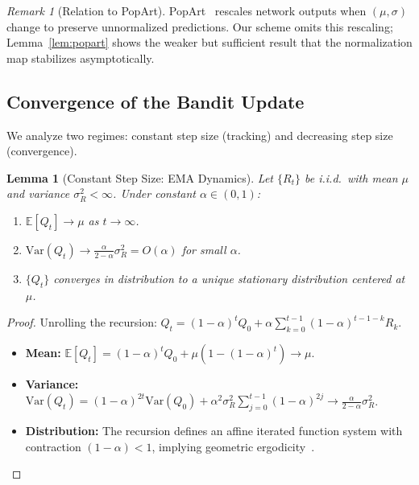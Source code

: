 \documentclass{article} %
\newtheorem{lemma}[theorem]{Lemma}
\theoremstyle{definition}
\theoremstyle{remark}
\newtheorem{remark}[theorem]{Remark}
\begin{document}
  \begin{remark}[Relation to PopArt]
  PopArt~\citep{hessel2019multi} rescales network outputs when $(\mu, \sigma)$ change to preserve unnormalized predictions. Our scheme omits this rescaling; Lemma~\ref{lem:popart} shows the weaker but sufficient result that the normalization map stabilizes asymptotically.
  \end{remark}

  \subsection{Convergence of the Bandit Update}

  We analyze two regimes: constant step size (tracking) and decreasing step size (convergence).

  \begin{lemma}[Constant Step Size: EMA Dynamics]
  \label{lem:ema}
  Let $\{R_t\}$ be i.i.d.\ with mean $\mu$ and variance $\sigma_R^2 < \infty$. Under constant $\alpha \in (0,1)$:
  \begin{enumerate}[label=(\roman*), leftmargin=1.5em]
      \item $\mathbb{E}[Q_t] \to \mu$ as $t \to \infty$.
      \item $\mathrm{Var}(Q_t) \to \frac{\alpha}{2-\alpha} \sigma_R^2 = O(\alpha)$ for small $\alpha$.
      \item $\{Q_t\}$ converges in distribution to a unique stationary distribution centered at $\mu$.
  \end{enumerate}
  \end{lemma}

  \begin{proof}
  Unrolling the recursion: $Q_t = (1-\alpha)^t Q_0 + \alpha \sum_{k=0}^{t-1} (1-\alpha)^{t-1-k} R_k$.
  \begin{itemize}[leftmargin=1.5em]
      \item \textbf{Mean:} $\mathbb{E}[Q_t] = (1-\alpha)^t Q_0 + \mu(1 - (1-\alpha)^t) \to \mu$.
      \item \textbf{Variance:} $\mathrm{Var}(Q_t) = (1-\alpha)^{2t} \mathrm{Var}(Q_0) + \alpha^2 \sigma_R^2 \sum_{j=0}^{t-1} (1-\alpha)^{2j} \to \frac{\alpha}{2-\alpha}\sigma_R^2$.
      \item \textbf{Distribution:} The recursion defines an affine iterated function system with contraction $(1-\alpha) < 1$, implying geometric ergodicity~\citep{sutton2018reinforcement}.
  \end{itemize}
  \end{proof}
\end{document}
